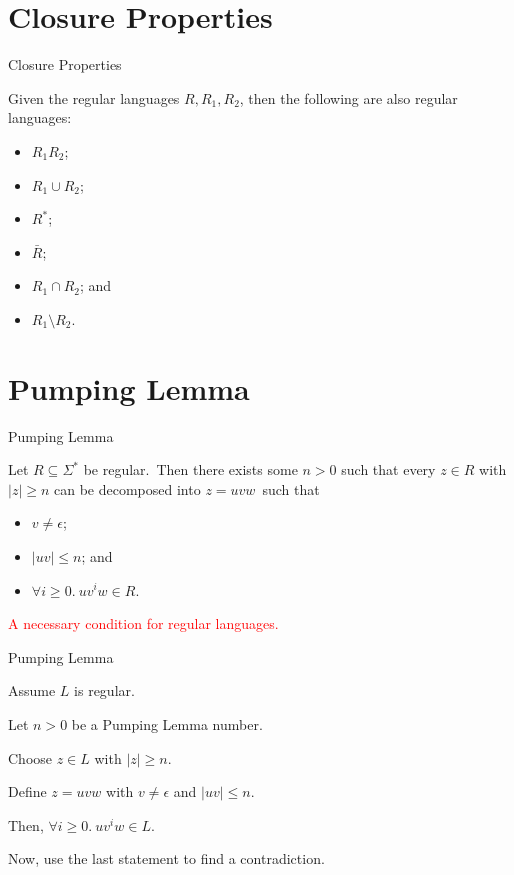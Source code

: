 \documentclass{beamer}
\def\r{\textcolor{red}}
\begin{document}
\section{Closure Properties}

\begin{frame}{Closure Properties}
    \begin{theorem}
        Given the regular languages $R, R_1, R_2$, then the following are also regular languages:\pause
        \begin{itemize}
            \item $R_1 R_2$\pause;
            \item $R_1 \cup R_2$\pause;
            \item $R^*$\pause;
            \item $\bar{R}$\pause;
            \item $R_1 \cap R_2$\pause; and
            \item $R_1 \setminus R_2$.
        \end{itemize}
    \end{theorem}
\end{frame}

\section{Pumping Lemma}

\begin{frame}{Pumping Lemma}
    \begin{lemma}
        Let $R \subseteq \Sigma^*$ be regular.\pause\ Then there exists some $n > 0$ such that every $z \in R$ with $|z| \geq n$ can be decomposed into $z = uvw$\pause\ such that
        \begin{itemize}
            \item $v \neq \epsilon$\pause;
            \item $|uv| \leq n$\pause; and
            \item $\forall i \geq 0.\ uv^iw \in R$.
        \end{itemize}
    \end{lemma}\pause
    \r{A necessary condition for regular languages.}
\end{frame}

\begin{frame}{Pumping Lemma}
    \begin{example}
        Assume $L$ is regular.\par
        Let $n > 0$ be a Pumping Lemma number.\pause\par
        Choose $z \in L$ with $|z| \geq n$.\par
        Define $z = uvw$ with $v \neq \epsilon$ and $|uv| \leq n$.\pause\par
        Then, $\forall i \geq 0.\ uv^iw \in L$.\pause\par
        Now, use the last statement to find a contradiction.
    \end{example}
\end{frame}
\end{document}
